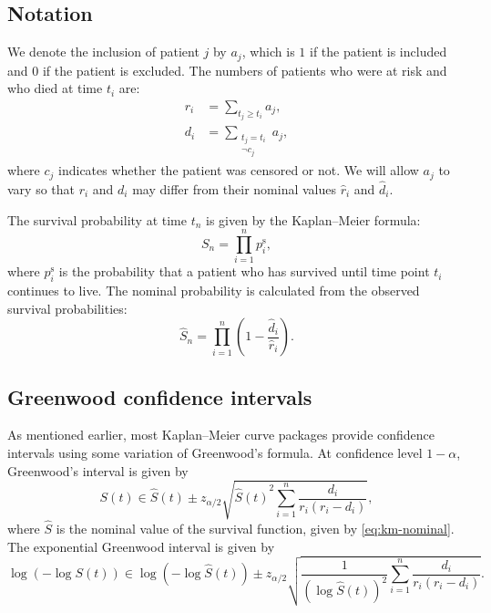 \documentclass[article]{jss}
\newcommand{\KM}{Kaplan--Meier} %
\begin{document}
\subsection{Notation}\label{sec:notation}

We denote the inclusion of patient \(j\) by \(a_j\), which is \(1\) if the patient is included and \(0\) if the patient is excluded. The numbers of patients who were at risk and who died at time \(t_i\) are:
\begin{align}
r_i &= \sum_{t_j \geq t_i} a_j, \\
d_i &= \sum_{\substack{t_j = t_i \\ \neg c_j}} a_j,
\end{align}
where \(c_j\) indicates whether the patient was censored or not. We will allow \(a_j\) to vary so that \(r_i\) and \(d_i\) may differ from their nominal values \(\hat{r}_i\) and \(\hat{d}_i\).

The survival probability at time \(t_n\) is given by the \KM{} formula:
\begin{equation}
S_n = \prod_{i=1}^{n} p_i^\text{s}, \label{eq:km-survival}
\end{equation}
where \(p_i^\text{s}\) is the probability that a patient who has survived until time point \(t_i\) continues to live. The nominal probability is calculated from the observed survival probabilities:
\begin{equation}
\hat{S}_n = \prod_{i=1}^{n} \left(1 - \frac{\hat{d}_i}{\hat{r}_i}\right). \label{eq:km-nominal}
\end{equation}

\subsection{Greenwood confidence intervals}\label{sec:greenwood}

As mentioned earlier, most \KM{} curve packages provide confidence intervals using some variation of Greenwood's formula. At confidence level \(1-\alpha\), Greenwood's interval is given by
\begin{equation}
\label{eq:greenwood}
S(t)\in\hat{S}(t) \pm z_{\alpha/2} \sqrt{{\hat{S}(t)}^2{\sum_{i=1}^{n} \frac{d_i}{r_i(r_i-d_i)}}},
\end{equation}
where \(\hat{S}\) is the nominal value of the survival function, given by \cref{eq:km-nominal}. The exponential Greenwood interval is given by
\begin{equation}
\label{eq:exponential-greenwood}
\log{\left(-\log S(t)\right)} \in \log{\left(-\log \hat{S}(t)\right)} \pm z_{\alpha/2} \sqrt{\frac{1}{{\left(\log \hat{S}(t)\right)}^2} \sum_{i=1}^{n} \frac{d_i}{r_i(r_i-d_i)}}.
\end{equation}
\end{document}
